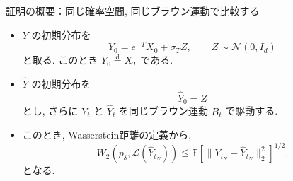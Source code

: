 \documentclass[11pt]{beamer}
\theoremstyle{plain}
\theoremstyle{definition}
\newcommand{\E}{\mathbb{E}}
\begin{document}
    \begin{frame}{証明の概要：同じ確率空間, 同じブラウン運動で比較する}
      \begin{itemize}
        \item $Y$ の初期分布を
        \begin{equation}
          Y_0=e^{-T}X_0+\sigma_TZ,\qquad Z\sim\mathcal{N}(0,I_d)
        \end{equation}
        と取る. このとき $Y_0\stackrel{\mathrm{d}}{=}X_T$ である.
        \item $\hat{Y}$ の初期分布を
        \begin{equation}
          \hat{Y}_0=Z
        \end{equation}
        とし, さらに $Y_t$ と $\hat{Y}_t$ を同じブラウン運動 $B_t$ で駆動する.
        \item このとき, Wasserstein距離の定義から, 
        \begin{equation}
          W_2(p_{\delta},\mathcal{L}(\hat{Y}_{t_N}))
          \leqq
          \E\left[\|Y_{t_N}-\hat{Y}_{t_N}\|_2^2\right]^{1/2}.
        \end{equation}
        となる.
      \end{itemize}
    \end{frame}
\end{document}
